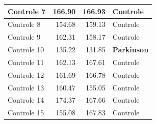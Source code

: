 \begin{table}[!htp]
\begin{tabular}{|l|l|l|l|}
Controle 7         & \multicolumn{1}{r|}{166.90}                                                          & \multicolumn{1}{r|}{166.93}                                                          & Controle                                                            \\ \hline
Controle 8         & \multicolumn{1}{r|}{154.68}                                                          & \multicolumn{1}{r|}{159.13}                                                          & Controle                                                            \\ \hline
Controle 9         & \multicolumn{1}{r|}{162.31}                                                          & \multicolumn{1}{r|}{158.17}                                                          & Controle                                                            \\ \hline
Controle 10         & \multicolumn{1}{r|}{135.22}                                                          & \multicolumn{1}{r|}{131.85}                                                          & \textbf{Parkinson}                                                            \\ \hline
Controle 11         & \multicolumn{1}{r|}{162.13}                                                          & \multicolumn{1}{r|}{167.61}                                                          & Controle                                                            \\ \hline
Controle 12         & \multicolumn{1}{r|}{161.69}                                                          & \multicolumn{1}{r|}{166.78}                                                          & Controle                                                            \\ \hline
Controle 13         & \multicolumn{1}{r|}{160.47}                                                          & \multicolumn{1}{r|}{155.05}                                                          & Controle                                                            \\ \hline
Controle 14         & \multicolumn{1}{r|}{174.37}                                                          & \multicolumn{1}{r|}{167.66}                                                          & Controle                                                            \\ \hline
Controle 15         & \multicolumn{1}{r|}{155.08}                                                          & \multicolumn{1}{r|}{167.83}                                                          & Controle                                                            \\ \hline

\end{tabular}
\end{table}
